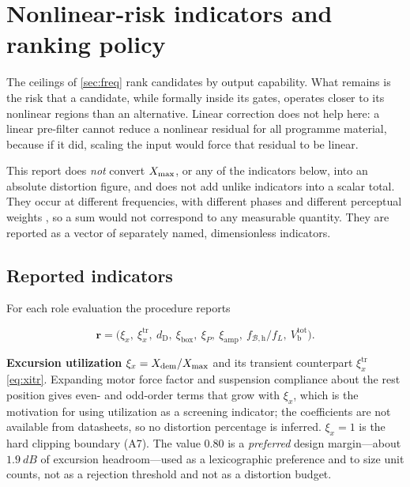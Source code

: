 \section{Nonlinear-risk indicators and ranking policy}
\label{sec:risk}

The ceilings of \cref{sec:freq} rank candidates by output capability. What
remains is the risk that a candidate, while formally inside its gates,
operates closer to its nonlinear regions than an alternative. Linear
correction does not help here: a linear pre-filter cannot reduce a
nonlinear residual for all programme material, because if it did, scaling
the input would force that residual to be linear.

This report does \emph{not} convert $X_{\mathrm{max}}$, or any of the indicators
below, into an absolute distortion figure, and does not add unlike
indicators into a scalar total. They occur at different frequencies, with
different phases and different perceptual weights
\cite{klippel2006,allison1982,fielder2019}, so a sum would not correspond
to any measurable quantity. They are reported as a vector of separately
named, dimensionless indicators.

\subsection{Reported indicators}
\label{sec:risk-vector}

For each role evaluation the procedure reports

\begin{equation}
	\mathbf r=\big(\xi_x,\ \xi_x^{\mathrm{tr}},\ d_{\mathrm D},\
		\xi_{\mathrm{box}},\ \xi_P,\ \xi_{\mathrm{amp}},\
		f_{\mathcal B,\mathrm h}/f_L,\ V_{\mathrm b}^{\mathrm{tot}}\big) .
	\label{eq:riskvec}
\end{equation}

\textbf{Excursion utilization} $\xi_x=X_{\mathrm{dem}}/X_{\mathrm{max}}$ and its
transient counterpart $\xi_x^{\mathrm{tr}}$ \cref{eq:xitr}. Expanding motor
force factor and suspension compliance about the rest position gives
even- and odd-order terms that grow with $\xi_x$, which is the motivation
for using utilization as a screening indicator; the coefficients are not
available from datasheets, so no distortion percentage is inferred.
$\xi_x=1$ is the hard clipping boundary (A7). The value $0.80$ is a
\emph{preferred} design margin---about $\SI{1.9}{dB}$ of excursion
headroom---used as a lexicographic preference and to size unit counts, not
as a rejection threshold and not as a distortion budget.

